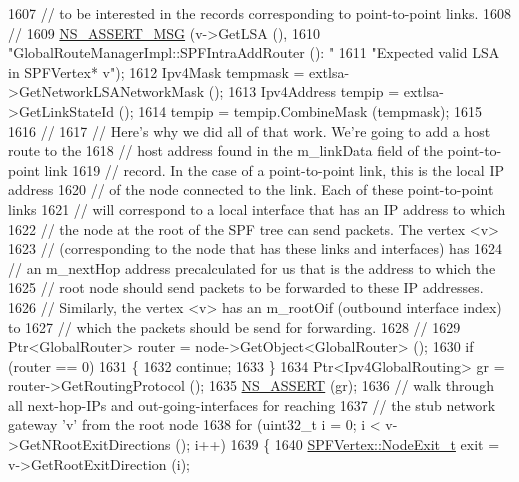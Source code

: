 \begin{DoxyCode}
1607 \textcolor{comment}{// to be interested in the records corresponding to point-to-point links.}
1608 \textcolor{comment}{//}
1609           \hyperlink{assert_8h_aff5ece9066c74e681e74999856f08539}{NS\_ASSERT\_MSG} (v->GetLSA (), 
1610                          \textcolor{stringliteral}{"GlobalRouteManagerImpl::SPFIntraAddRouter (): "}
1611                          \textcolor{stringliteral}{"Expected valid LSA in SPFVertex* v"});
1612           Ipv4Mask tempmask = extlsa->GetNetworkLSANetworkMask ();
1613           Ipv4Address tempip = extlsa->GetLinkStateId ();
1614           tempip = tempip.CombineMask (tempmask);
1615 
1616 \textcolor{comment}{//}
1617 \textcolor{comment}{// Here's why we did all of that work.  We're going to add a host route to the}
1618 \textcolor{comment}{// host address found in the m\_linkData field of the point-to-point link}
1619 \textcolor{comment}{// record.  In the case of a point-to-point link, this is the local IP address}
1620 \textcolor{comment}{// of the node connected to the link.  Each of these point-to-point links}
1621 \textcolor{comment}{// will correspond to a local interface that has an IP address to which}
1622 \textcolor{comment}{// the node at the root of the SPF tree can send packets.  The vertex <v> }
1623 \textcolor{comment}{// (corresponding to the node that has these links and interfaces) has }
1624 \textcolor{comment}{// an m\_nextHop address precalculated for us that is the address to which the}
1625 \textcolor{comment}{// root node should send packets to be forwarded to these IP addresses.}
1626 \textcolor{comment}{// Similarly, the vertex <v> has an m\_rootOif (outbound interface index) to}
1627 \textcolor{comment}{// which the packets should be send for forwarding.}
1628 \textcolor{comment}{//}
1629           Ptr<GlobalRouter> router = node->GetObject<GlobalRouter> ();
1630           \textcolor{keywordflow}{if} (router == 0)
1631             \{
1632               \textcolor{keywordflow}{continue};
1633             \}
1634           Ptr<Ipv4GlobalRouting> gr = router->GetRoutingProtocol ();
1635           \hyperlink{assert_8h_a6dccdb0de9b252f60088ce281c49d052}{NS\_ASSERT} (gr);
1636           \textcolor{comment}{// walk through all next-hop-IPs and out-going-interfaces for reaching}
1637           \textcolor{comment}{// the stub network gateway 'v' from the root node}
1638           \textcolor{keywordflow}{for} (uint32\_t i = 0; i < v->GetNRootExitDirections (); i++)
1639             \{
1640               \hyperlink{classns3_1_1SPFVertex_a0adf6255ec0357050ef5436597b4cb32}{SPFVertex::NodeExit\_t} exit = v->GetRootExitDirection (i);

\end{DoxyCode}
